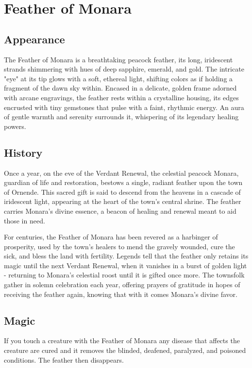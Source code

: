 \ItemSubCategory{}

\chapter*{Feather of Monara}
\section*{Appearance}
The Feather of Monara is a breathtaking peacock feather, its long, iridescent strands shimmering with hues of deep sapphire, emerald, and gold. The intricate "eye" at its tip glows with a soft, ethereal light, shifting colors as if holding a fragment of the dawn sky within. Encased in a delicate, golden frame adorned with arcane engravings, the feather rests within a crystalline housing, its edges encrusted with tiny gemstones that pulse with a faint, rhythmic energy. An aura of gentle warmth and serenity surrounds it, whispering of its legendary healing powers.

\section*{History}
Once a year, on the eve of the Verdant Renewal, the celestial peacock Monara, guardian of life and restoration, bestows a single, radiant feather upon the town of Ornende. This sacred gift is said to descend from the heavens in a cascade of iridescent light, appearing at the heart of the town's central shrine. The feather carries Monara's divine essence, a beacon of healing and renewal meant to aid those in need.

For centuries, the Feather of Monara has been revered as a harbinger of prosperity, used by the town's healers to mend the gravely wounded, cure the sick, and bless the land with fertility. Legends tell that the feather only retains its magic until the next Verdant Renewal, when it vanishes in a burst of golden light - returning to Monara's celestial roost until it is gifted once more. The townsfolk gather in solemn celebration each year, offering prayers of gratitude in hopes of receiving the feather again, knowing that with it comes Monara's divine favor.

\section*{Magic}
If you touch a creature with the Feather of Monara any disease that affects the creature are cured and it removes the blinded, deafened, paralyzed, and poisoned conditions. The feather then disappears.